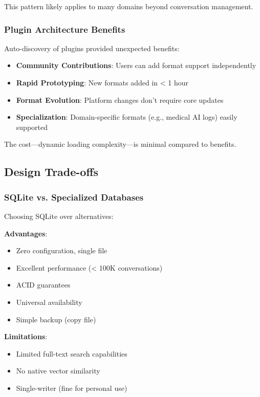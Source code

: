 \documentclass[11pt,letterpaper]{article}
\begin{document}
This pattern likely applies to many domains beyond conversation management.

\subsubsection{Plugin Architecture Benefits}

Auto-discovery of plugins provided unexpected benefits:

\begin{itemize}
    \item \textbf{Community Contributions}: Users can add format support independently
    \item \textbf{Rapid Prototyping}: New formats added in < 1 hour
    \item \textbf{Format Evolution}: Platform changes don't require core updates
    \item \textbf{Specialization}: Domain-specific formats (e.g., medical AI logs) easily supported
\end{itemize}

The cost---dynamic loading complexity---is minimal compared to benefits.

\subsection{Design Trade-offs}

\subsubsection{SQLite vs. Specialized Databases}

Choosing SQLite over alternatives:

\textbf{Advantages}:
\begin{itemize}
    \item Zero configuration, single file
    \item Excellent performance (< 100K conversations)
    \item ACID guarantees
    \item Universal availability
    \item Simple backup (copy file)
\end{itemize}

\textbf{Limitations}:
\begin{itemize}
    \item Limited full-text search capabilities
    \item No native vector similarity
    \item Single-writer (fine for personal use)
\end{itemize}
\end{document}

